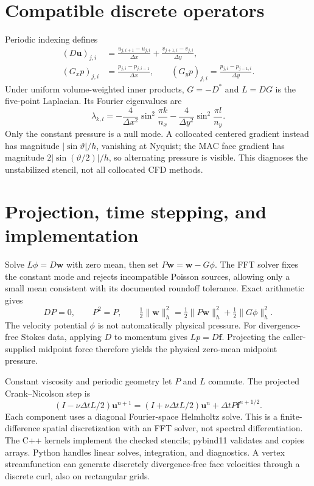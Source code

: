 \documentclass[10pt,a4paper]{article}
\begin{document}
\section{Compatible discrete operators}
Periodic indexing defines
\begin{align}
(D\mathbf u)_{j,i}&=\frac{u_{j,i+1}-u_{j,i}}{\Delta x}
+\frac{v_{j+1,i}-v_{j,i}}{\Delta y},\\
(G_xp)_{j,i}&=\frac{p_{j,i}-p_{j,i-1}}{\Delta x},\qquad
(G_yp)_{j,i}=\frac{p_{j,i}-p_{j-1,i}}{\Delta y}.
\end{align}
Under uniform volume-weighted inner products, $G=-D^*$ and $L=DG$ is the five-point Laplacian. Its Fourier eigenvalues are
\begin{equation}
\lambda_{k,l}=-\frac{4}{\Delta x^2}\sin^2\frac{\pi k}{n_x}
-\frac{4}{\Delta y^2}\sin^2\frac{\pi l}{n_y}.
\end{equation}
Only the constant pressure is a null mode. A collocated centered gradient instead has magnitude $|\sin\vartheta|/h$, vanishing at Nyquist; the MAC face gradient has magnitude $2|\sin(\vartheta/2)|/h$, so alternating pressure is visible. This diagnoses the unstabilized stencil, not all collocated CFD methods.
\newpage
\section{Projection, time stepping, and implementation}
Solve $L\phi=D\mathbf w$ with zero mean, then set $P\mathbf w=\mathbf w-G\phi$. The FFT solver fixes the constant mode and rejects incompatible Poisson sources, allowing only a small mean consistent with its documented roundoff tolerance. Exact arithmetic gives
\begin{equation}
DP=0,\qquad P^2=P,\qquad
\tfrac12\|\mathbf w\|_h^2=\tfrac12\|P\mathbf w\|_h^2+\tfrac12\|G\phi\|_h^2.
\end{equation}
The velocity potential $\phi$ is not automatically physical pressure. For divergence-free Stokes data, applying $D$ to momentum gives $Lp=D\mathbf f$. Projecting the caller-supplied midpoint force therefore yields the physical zero-mean midpoint pressure.

Constant viscosity and periodic geometry let $P$ and $L$ commute. The projected Crank--Nicolson step is
\begin{equation}
(I-\nu\Delta t L/2)\mathbf u^{n+1}
=(I+\nu\Delta t L/2)\mathbf u^n+\Delta t P\mathbf f^{n+1/2}.
\end{equation}
Each component uses a diagonal Fourier-space Helmholtz solve. This is a finite-difference spatial discretization with an FFT solver, not spectral differentiation. The C++ kernels implement the checked stencils; pybind11 validates and copies arrays. Python handles linear solves, integration, and diagnostics. A vertex streamfunction can generate discretely divergence-free face velocities through a discrete curl, also on rectangular grids.
\end{document}
